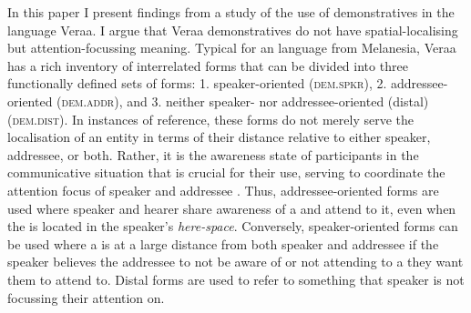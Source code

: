 \documentclass[output=paper
,modfonts
,nonflat]{langsci/langscibook}
\begin{document}
In this paper I present findings from a study of the use of demonstratives in the  language Vera{\textquotesingle}a. I argue that Vera{\textquotesingle}a demonstratives do not have spa\-tial-lo\-cal\-ising but attention-focussing meaning. Typical for an  language from Melanesia, Vera{\textquotesingle}a has a rich inventory of interrelated  forms that can be divided into three functionally defined sets of forms: 1. speaker-oriented (\textsc{dem.spkr}), 2. addressee-oriented (\textsc{dem.addr}), and 3. neither speaker- nor addressee-oriented (distal) (\textsc{dem.dist}). In instances of  reference, these forms do not merely serve the localisation of an entity in terms of their distance relative to either speaker, addressee, or both. Rather, it is the awareness state of participants in the communicative situation that is crucial for their  use, serving to coordinate the attention focus of speaker and addressee \citep{Diessel2006}. Thus, addressee-oriented forms are used where speaker and hearer share awareness of a  and attend to it, even when the  is located in the speaker's \textit{here-space}. Conversely, speaker-oriented forms can be used where a  is at a large distance from both speaker and addressee if the speaker believes the addressee to not be aware of or not attending to a  they want them to attend to. Distal forms are used to refer to something that speaker is not focussing their attention on. 
\end{document}
